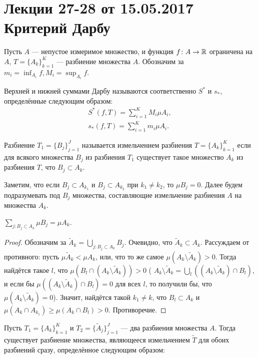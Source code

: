 \pagestyle{fancy}
\section{Лекции 27-28 от 15.05.2017 \\ Критерий Дарбу}
Пусть $A$ --- непустое измеримое множество, и функция $f\colon A \to \mathbb{R}$ ограничена на $A$, $T = \{A_k\}_{k =1}^{K}$ --- разбиение множества $A$. Обозначим за $m_i = \inf_{A_i} f, M_i = \sup_{A_i} f$.
\begin{Def}
    Верхней и нижней суммами Дарбу называются соответственно $S^*$ и $s_*$, определённые следующим образом:
\begin{gather}
    S^*(f, T) = \sum\limits_{i =1}^{K} M_i \mu A_i,\\
    s_*(f, T) = \sum\limits_{i =1}^{K} m_i \mu A_i.
\end{gather}
\end{Def}
\begin{Def}
    Разбиение $T_1 = \{B_j\}_{j =1}^{J}$ называется измельчением разбиения $T = \{A_k\}_{k=1}^{K}$ если для всякого множества $B_j$ из разбиения $T_1$ существует такое множество $A_k$ из разбиения $T$, что $B_j \subset A_k$. 
\end{Def}
Заметим, что если $B_j \subset A_{k_1}$ и $B_j \subset A_{k_2}$ при $k_1 \neq k_2$, то $\mu B_j = 0$. Далее будем подразумевать под $B_j$ множества, составляющие измельчение разбиения $A$ на множества $A_k$. 
\begin{Statement}
    $\sum \limits_{j\colon B_j \subset A_k}\mu B_j = \mu A_k$.
\end{Statement}
\begin{proof}
    Обозначим за $\widetilde{A}_k = \bigcup\limits_{j\colon B_j \subset A_k}B_j$. Очевидно, что $\widetilde{A}_k \subset A_k$. Рассуждаем от противного: пусть $\mu \widetilde{A}_k < \mu A_k$, или, что то же самое $ \mu(A_k\setminus \widetilde{A}_k ) > 0$. Тогда найдётся такое $l$, что $\mu (B_l \cap (A_k \setminus \widetilde{A}_k)) > 0$ ( $A_k \setminus \widetilde{A}_k = \bigcup\limits_{l}((A_k \setminus \widetilde{A}_k)\cap B_l)$, и если бы $\mu((A_k \setminus \widetilde{A}_k)\cap B_l) = 0$ для всех $l$, то получили бы, что $\mu(A_k \setminus \widetilde{A}_k) = 0$). Значит, найдётся такой $k_1 \neq k$, что $B_l \subset A_k$ и $\mu(A_k \cap A_{k_1}) \geqslant \mu(A_k \cap B_l) > 0$. Противоречие.
\end{proof}
Пусть $T_1 = \{A_k\}_{k =1}^{K}$ и $T_2 = \{\widetilde{A}_j\}_{j=1}^{J}$ --- два разбиения множества $A$. Тогда существует разбиение множества, являющееся измельчением $\widetilde{T}$ для обоих разбиений сразу, определённое следующим образом:
